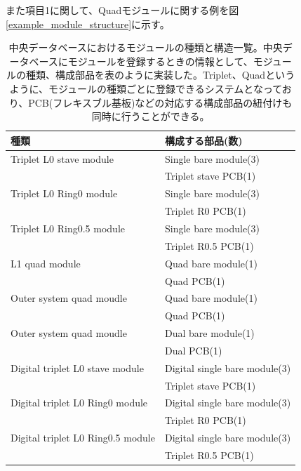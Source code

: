また項目1に関して、Quadモジュールに関する例を図\ref{example_module_structure}に示す。

\begin{table}[btp]
\begin{center}
\caption[中央データベースにおけるモジュールの種類と構造一覧]{中央データベースにおけるモジュールの種類と構造一覧。中央データベースにモジュールを登録するときの情報として、モジュールの種類、構成部品を表のように実装した。Triplet、Quadというように、モジュールの種類ごとに登録できるシステムとなっており、PCB(フレキスブル基板)などの対応する構成部品の紐付けも同時に行うことができる。}
\label{pd_module_structure}
  \scriptsize
  \begin{tabular}{|ll|} \hline
    種類 & 構成する部品(数) \\ \hline
    Triplet L0 stave module   &  Single bare module(3) \\
                              &  Triplet stave PCB(1) \\\hline
    Triplet L0 Ring0 module   &  Single bare module(3) \\
                              &  Triplet R0 PCB(1) \\\hline
    Triplet L0 Ring0.5 module &  Single bare module(3) \\
                              &  Triplet R0.5 PCB(1) \\\hline
    L1 quad module            &  Quad bare module(1) \\
                              &  Quad PCB(1) \\\hline
    Outer system quad moudle  &  Quad bare module(1) \\
                              &  Quad PCB(1) \\\hline
    Outer system quad moudle  &  Dual bare module(1) \\
                              &  Dual PCB(1) \\\hline
    Digital triplet L0 stave module   &  Digital single bare module(3) \\
                                      &  Triplet stave PCB(1) \\\hline
    Digital triplet L0 Ring0 module   &  Digital single bare module(3) \\
                                      &  Triplet R0 PCB(1) \\\hline
    Digital triplet L0 Ring0.5 module &  Digital single bare module(3) \\
                                      &  Triplet R0.5 PCB(1) \\\hline

\end{tabular}
\end{center}
\end{table}
